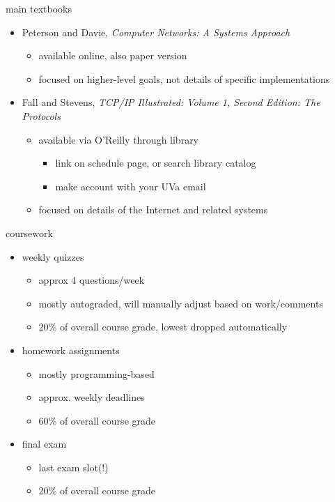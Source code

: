 
\begin{frame}{main textbooks}
    \begin{itemize}
    \item Peterson and Davie, \textit{Computer Networks:  A Systems Approach}
        \begin{itemize}
        \item available online, also paper version
        \item focused on higher-level goals, not details of specific implementations
        \end{itemize}
    \item Fall and Stevens, \textit{TCP/IP Illustrated: Volume 1, Second Edition: The Protocols}
        \begin{itemize}
        \item available via O'Reilly through library
            \begin{itemize}
            \item link on schedule page, or search library catalog
            \item make account with your UVa email
            \end{itemize}
        \item focused on details of the Internet and related systems
        \end{itemize}
    \end{itemize}
\end{frame}

\begin{frame}{coursework}
    \begin{itemize}
    \item weekly quizzes
        \begin{itemize}
        \item approx 4 questions/week
        \item mostly autograded, will manually adjust based on work/comments
        \item 20\% of overall course grade, lowest dropped automatically
        \end{itemize}
    \item homework assignments
        \begin{itemize}
        \item mostly programming-based
        \item approx. weekly deadlines
        \item 60\% of overall course grade
        \end{itemize}
    \item final exam
        \begin{itemize}
        \item last exam slot(!)
        \item 20\% of overall course grade
        \end{itemize}
    \end{itemize}
\end{frame}

